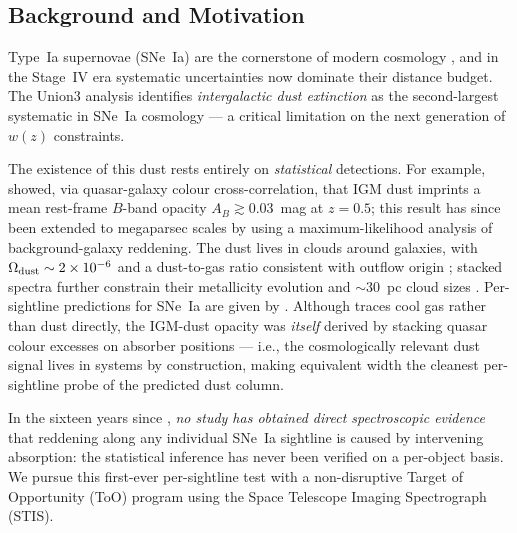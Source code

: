\documentclass[12pt]{article}
\begin{document}

\justification %

\subsection*{Background and Motivation}

Type~Ia supernovae (SNe~Ia) are the cornerstone of modern cosmology
\citep{Riess1998, Perlmutter1999}, and in the Stage~IV era systematic
uncertainties now dominate their distance budget. The Union3 analysis
\citep{Rubin2023} identifies \emph{intergalactic dust extinction} as the
second-largest systematic in SNe~Ia cosmology --- a critical limitation
on the next generation of $w(z)$ constraints.

The existence of this dust rests entirely on \emph{statistical}
detections. For example, \citet{Menard2010} showed, via quasar-galaxy colour
cross-correlation, that IGM dust imprints a mean rest-frame $B$-band
opacity $A_B\gtrsim0.03$~mag at $z=0.5$; this result has since been
extended to megaparsec scales by \citet{McCleary2026} using a
maximum-likelihood analysis of background-galaxy reddening. The dust
lives in  clouds around galaxies, with
$\Omega_{\rm dust}\sim2\times10^{-6}$ and a dust-to-gas ratio
consistent with outflow origin \citep{MenardFukugita2012, LanMo2018};
stacked spectra further constrain their metallicity evolution and
$\sim$30~pc cloud sizes \citep{LanFukugita2017}. Per-sightline
predictions for SNe~Ia are given by \citet{2010ApJ...716..712A}. Although
 traces cool gas rather than dust directly, the
\citet{Menard2010} IGM-dust opacity was \emph{itself} derived by
stacking quasar colour excesses on  absorber positions ---
i.e., the cosmologically relevant dust signal lives in 
systems by construction, making  equivalent width the
cleanest per-sightline probe of the predicted dust column.

In the sixteen years since \citet{Menard2010}, \emph{no study has
obtained direct spectroscopic evidence} that reddening along any
individual SNe~Ia sightline is caused by intervening 
absorption: the statistical inference has never been verified on a
per-object basis. We pursue this first-ever per-sightline test with a
non-disruptive Target of Opportunity (ToO) program using the Space
Telescope Imaging Spectrograph (STIS).
\end{document}
